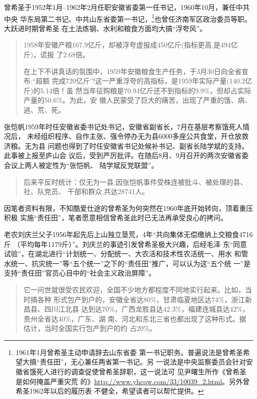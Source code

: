 曾希圣于1952年1月--1962年2月任职安徽省委第一任书记，1960年10月，兼任中共中央
华东局第二书记、中共山东省委第一书记，\footnote{1961年1月曾希圣主动申请辞去山东省委
  第一书记职务。普遍说法是曾希圣希望大搞“责任田”，无心兼任两省第一书记。另
  一说法是中央监察委员会针对安徽省饿死人进行的调查促使曾希圣辞职，这一说法可
  见尹曙生所作《曾希圣是如何掩盖严重灾荒
  的》\url{http://www.yhcqw.com/33/10039_2.html}。另外曾希圣1962年以后的履历表
  不健全，希望读者可以帮忙提供。}也曾任济南军区政治委员等职。大跃进时期曾希圣
在土法炼钢、水利和粮食方面均大搞“浮夸风”。
\begin{quotation}
  1958年安徽产粮167.9亿斤，却被浮夸虚报成450亿斤(指标更高,是494亿斤)，谎报
  了2.68倍。\cite{zhangfandang}

  在上下不讲真话的氛围中，1959年安徽粮食生产任务，于3月30日向全省宣布:“超额
  完成720亿斤”!这一严重浮夸的高指标，是1959年实际产量(140.2亿斤)的5.14倍！虽
  然当年征购粮是70.94亿斤还不到指标的9.9\%，但却占实际产量的50.6\%。为此，安
  徽人民蒙受了巨大的痛苦，出现了严重的饿、病、逃、荒、死。\cite{zhang1959}
\end{quotation}

张恺帆1959年时任安徽省委书记处书记，安徽省副省长，7月在基层考察饿死人情况后，
未经组织程序、自作主张、强令停办无为县6000多座公共食堂，开仓放救济粮。无为县
问题也得到了时任安徽省书记处候补书记、副省长陆学斌的支持。此事被上报至庐山会
议后，受到严厉批评。在随后8月、9月召开的两次安徽省委会议上两人被定性为“张恺帆、
陆学斌反党联盟”。
\begin{quotation}
  后来平反时统计：仅无为一县,因张恺帆事件受株连被批斗、被处理的县、社、队党员、
  干部和群众,共达28741人。\cite{zhang1959}
\end{quotation}

因笔者资料有限，不知酷爱仕途的曾希圣为何突然在1960年底开始转向，顶着重压积极
实施“责任田”，笔者愿意相信曾希圣此时已无法再承受良心的拷问。

老农刘庆兰父子1956年起先后上山独立垦荒，4年“共向集体无偿缴纳上交粮食4716斤
（平均每年1179斤）”。\cite{anhuiliushi}刘庆兰的事迹引发曾希圣极大兴趣，后经毛泽
东“同意试验”，在湖北进行“计划统一、分配统一、大农活和技术性农活统一、用水
和管水统一、抗灾统一”等“五个统一”之下的“责任田”推广，可以认为这“五个统
一”是支持“责任田”官员心目中的“社会主义政治屏障”。

\begin{quotation}
  它一问世就很受农民欢迎，全国不少地方都程度不同地实行起来。比如，当时搞各种
  形式包产到户的，安徽全省达80\%，甘肃临夏地区达74\%，浙江新昌县、四川江北县
  达到达70\%，广西龙胜县达42.3\%，福建连城县达42\%，贵州全省达40\%，广东、湖
  南、河北和东北三省也都出现了这种形式。据估计，当时全国实行包产到户的约
  占20\%。
\end{quotation}

